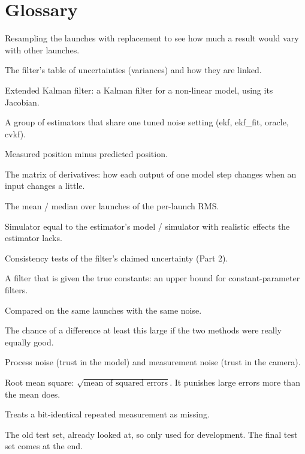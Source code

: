 \documentclass[11pt,a4paper]{article}
\begin{document}
\section{Glossary}
\begin{description}[style=nextline,leftmargin=1.2cm]
\item[Bootstrap] Resampling the launches with replacement to see how much a result would vary with other launches.
\item[Covariance $P$] The filter's table of uncertainties (variances) and how they are linked.
\item[EKF] Extended Kalman filter: a Kalman filter for a non-linear model, using its Jacobian.
\item[Family] A group of estimators that share one tuned noise setting (ekf, ekf\_fit, oracle, cvkf).
\item[Innovation] Measured position minus predicted position.
\item[Jacobian $F$] The matrix of derivatives: how each output of one model step changes when an input changes a little.
\item[Launch mean / median] The mean / median over launches of the per-launch RMS.
\item[Matched / mismatch physics] Simulator equal to the estimator's model / simulator with realistic effects the estimator lacks.
\item[NIS / NEES] Consistency tests of the filter's claimed uncertainty (Part 2).
\item[Oracle] A filter that is given the true constants: an upper bound for constant-parameter filters.
\item[Paired] Compared on the same launches with the same noise.
\item[p-value] The chance of a difference at least this large if the two methods were really equally good.
\item[$q$, $\sigma$] Process noise (trust in the model) and measurement noise (trust in the camera).
\item[RMS] Root mean square: $\sqrt{\text{mean of squared errors}}$. It punishes large errors more than the mean does.
\item[StaleGuard] Treats a bit-identical repeated measurement as missing.
\item[Test (dev)] The old test set, already looked at, so only used for development. The final test set comes at the end.
\end{description}
\end{document}
